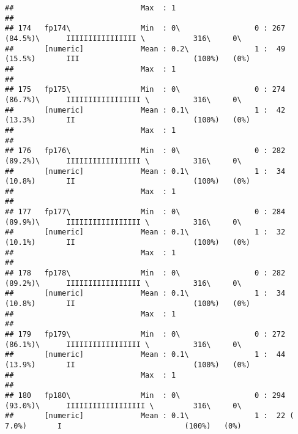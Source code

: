 \documentclass[]{article}
\begin{document}
\begin{verbatim}
##                             Max  : 1                                                                                       
## 
## 174   fp174\                Min  : 0\                 0 : 267 (84.5%)\      IIIIIIIIIIIIIIII \           316\     0\       
##       [numeric]             Mean : 0.2\               1 :  49 (15.5%)       III                          (100%)   (0%)     
##                             Max  : 1                                                                                       
## 
## 175   fp175\                Min  : 0\                 0 : 274 (86.7%)\      IIIIIIIIIIIIIIIII \          316\     0\       
##       [numeric]             Mean : 0.1\               1 :  42 (13.3%)       II                           (100%)   (0%)     
##                             Max  : 1                                                                                       
## 
## 176   fp176\                Min  : 0\                 0 : 282 (89.2%)\      IIIIIIIIIIIIIIIII \          316\     0\       
##       [numeric]             Mean : 0.1\               1 :  34 (10.8%)       II                           (100%)   (0%)     
##                             Max  : 1                                                                                       
## 
## 177   fp177\                Min  : 0\                 0 : 284 (89.9%)\      IIIIIIIIIIIIIIIII \          316\     0\       
##       [numeric]             Mean : 0.1\               1 :  32 (10.1%)       II                           (100%)   (0%)     
##                             Max  : 1                                                                                       
## 
## 178   fp178\                Min  : 0\                 0 : 282 (89.2%)\      IIIIIIIIIIIIIIIII \          316\     0\       
##       [numeric]             Mean : 0.1\               1 :  34 (10.8%)       II                           (100%)   (0%)     
##                             Max  : 1                                                                                       
## 
## 179   fp179\                Min  : 0\                 0 : 272 (86.1%)\      IIIIIIIIIIIIIIIII \          316\     0\       
##       [numeric]             Mean : 0.1\               1 :  44 (13.9%)       II                           (100%)   (0%)     
##                             Max  : 1                                                                                       
## 
## 180   fp180\                Min  : 0\                 0 : 294 (93.0%)\      IIIIIIIIIIIIIIIIII \         316\     0\       
##       [numeric]             Mean : 0.1\               1 :  22 ( 7.0%)       I                            (100%)   (0%)     

\end{verbatim}
\end{document}
